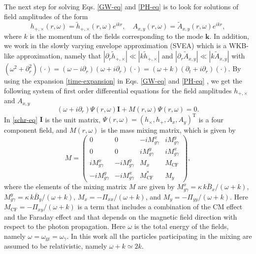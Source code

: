 \documentclass[a4paper,11pt]{article}
\newcommand{\bs}{\boldsymbol}
\begin{document}
The next step for solving Eqs. \eqref{GW-eq} and \eqref{PH-eq} is to look for solutions of field amplitudes of the form 
\begin{equation}\label{time-expansion}
h_{+, \times}(r, \omega)=\tilde{h} _{+, \times}(r, \omega)e^{i kr},\quad  A_{x, y}(r, \omega)=\tilde A_{x, y}(r, \omega)e^{i kr},
\end{equation}
where $k$ is the momentum of the fields corresponding to the mode $\bs k$. In addition, we work in the slowly varying envelope approximation (SVEA) which is a WKB-like approximation, namely that $|\partial_r \tilde h_{+, \times}|\ll | k \tilde h_{+, \times}|$ and $|\partial_r \tilde A_{x, y}|\ll |k \tilde A_{x, y}|$ with $(\omega^2 + \partial_r^2)(\cdot)=(\omega-i\partial_r)(\omega +i\partial_r)(\cdot)= (\omega+k)(\partial_t +i \partial_r)(\cdot)$. By using the expansion \eqref{time-expansion} in Eqs. \eqref{GW-eq} and \eqref{PH-eq} , we get the following system of first order differential equations for the field amplitudes $ h_{+, \times}$ and $A_{x, y}$
\begin{equation}\label{schr-eq}
(\omega + i\partial_r)\Psi(r, \omega)\bs I+M(r, \omega) \Psi(r, \omega)=0. 
\end{equation}
In \eqref{schr-eq} $\bs I$ is the unit matrix, $\Psi(r, \omega)=( h_\times, h_+,  A_x,  A_y)^\text{T}$ is a four component field, and $M(r, \omega)$ is the mass mixing matrix, which is given by
\begin{equation}\label{mixing-matrix}
 M=\begin{pmatrix}
  0 & 0 & -iM_{g\gamma}^x & iM_{g\gamma}^y \\
0 & 0 & iM_{g\gamma}^y & iM_{g\gamma}^x \\
iM_{g\gamma}^x & -iM_{g\gamma}^y & M_x & M_\text{CF} \\
-iM_{g\gamma}^y & -iM_{g\gamma}^x & M_\text{CF}^* & M_y
   \end{pmatrix},
   \end{equation}
where the elements of the mixing matrix $M$ are given by $M_{g\gamma}^{x}=\kappa\,k \bar B_x/(\omega+k)$, $M_{g\gamma}^y=\kappa \,k \bar B_{y}/(\omega+k)$, $M_x=-\Pi_{xx}/(\omega+k)$, and $M_y=-\Pi_{yy}/(\omega+k)$. Here $M_\text{CF}= - \Pi_{xy}/(\omega+ k)$ is a term that includes a combination of the CM effect and the Faraday effect and that depends on the magnetic field direction with respect to the photon propagation.  Here $\omega$ is the total energy of the fields, namely $\omega=\omega_\text{gr}=\omega_{\gamma}$. In this work all the particles participating in the mixing are assumed to be relativistic, namely $\omega+k\simeq 2k$.
\end{document}
